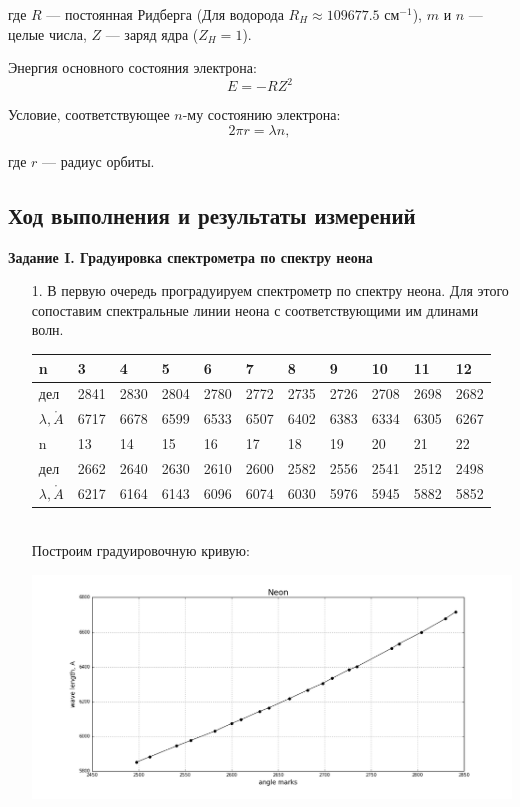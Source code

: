 \documentclass[12pt]{report}
\begin{document}
где $R$ --- постоянная Ридберга (Для водорода $R_H \approx 109677.5 \text{ см}^{-1}$), $m$ и $n$ --- целые числа, $Z$ --- заряд ядра ($Z_H = 1$).

Энергия основного состояния электрона:
$$E = -RZ^2$$

Условие, соответствующее $n$-му состоянию электрона:
$$2\pi r = \lambda n,$$

где $r$ --- радиус орбиты.


\subsection*{Ход выполнения и результаты измерений}

\textbf{Задание I. Градуировка спектрометра по спектру неона}

\begin{enumerate}

\item[1.] В первую очередь проградуируем спектрометр по спектру неона.
Для этого сопоставим спектральные линии неона с соответствующими им
длинами волн.

{
    \centering
    \begin{tabularx}{0.937\textwidth}{|X|X|X|X|X|X|X|X|X|X|X|}
        \hline
        n & 3 & 4 & 5 & 6 & 7 & 8 & 9 & 10 & 11 & 12 \\
        \hline
        дел & 2841 & 2830 & 2804 & 2780 & 2772 & 2735 & 2726 & 2708 & 2698 & 2682\\
        \hline
        $\lambda, \mathring{A}$ & 6717 & 6678 & 6599 & 6533 & 6507 & 6402 & 6383 & 6334 & 6305 & 6267\\
        \hline
        \hline
        n & 13 & 14 & 15 & 16 & 17 & 18 & 19 & 20 & 21 & 22 \\
        \hline
        дел  & 2662 & 2640 & 2630 & 2610 & 2600 & 2582 & 2556 & 2541 & 2512 & 2498 \\
        \hline
        $\lambda, \mathring{A}$  & 6217 & 6164 & 6143 & 6096 & 6074 & 6030 & 5976 & 5945 & 5882 & 5852  \\
        \hline
    \end{tabularx}
}
\\

Построим градуировочную кривую:

\includegraphics[width=0.94 \textwidth]{g1_neon.png}



\end{enumerate}
\end{document}
